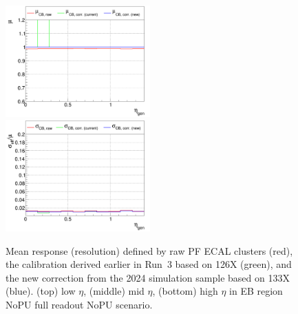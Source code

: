 \begin{figure}
\includegraphics[width=0.495\textwidth]{./plots_pdf/ECAL_plots/plotsNOPU/EB/FULL/pdf/GENETA/EBFULL_GENETA_0100_0300_MuOverBins.pdf}
\includegraphics[width=0.495\textwidth]{./plots_pdf/ECAL_plots/plotsNOPU/EB/FULL/pdf/GENETA/EBFULL_GENETA_0100_0300_EffSigmaOverBins.pdf}

\caption [$\mu$ ($\sigma_\mathrm{eff}$) vs. $\eta$ of PF ECAL cluster - EB full readout NoPU scenario.]{Mean response (resolution) defined by raw PF ECAL clusters (red), the calibration derived earlier in Run~3 based on 126X (green), and the new correction from the 2024 simulation sample based on 133X (blue). (top) low $\eta$, (middle) mid $\eta$, (bottom) high $\eta$ in EB region NoPU full readout NoPU scenario.}
\label{fig:NOPU_EBFULL_eta}
\end{figure}









